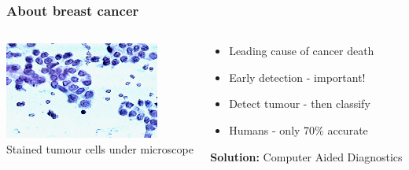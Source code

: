 \documentclass[aspectratio=1610]{beamer}
\begin{document}
\begin{frame}
  \frametitle{\hfill About breast cancer}
  \begin{columns}[T]
    \begin{column}{.5\textwidth}
      \begin{block}{}
        \includegraphics[width=\textwidth]{images/fna_nuclei.png}\\
        Stained tumour cells under microscope
      \end{block}
    \end{column}
    \begin{column}{.5\textwidth}
      \begin{block}{}
        \begin{itemize}
          \item Leading cause of cancer death\pause
          \item Early detection - important!\pause
          \item Detect tumour - then classify\pause
          \item Humans - only 70\% accurate\pause
        \end{itemize}
        \vspace{0.02\textheight}
        \textbf{Solution:} Computer Aided Diagnostics
      \end{block}
    \end{column}
  \end{columns}
\end{frame}
\end{document}
